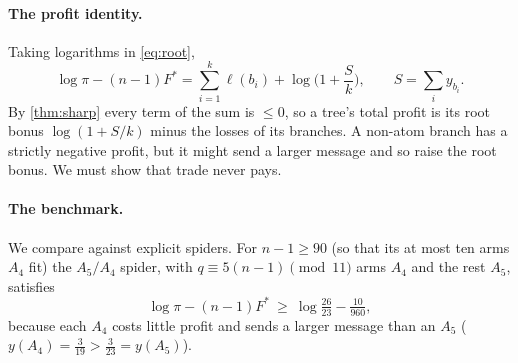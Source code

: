 \documentclass[11pt]{article}
\theoremstyle{definition}
\newcommand{\bell}{\ell}
\newcommand{\Fs}{F^{\ast}}
\begin{document}
\paragraph{The profit identity.} Taking logarithms in \eqref{eq:root},
\begin{equation}\label{eq:lagrange}
  \log\pi-(n-1)\Fs=\sum_{i=1}^{k}\bell(b_i)+\log\Big(1+\frac{S}{k}\Big),\qquad S=\sum_i y_{b_i}.
\end{equation}
By \cref{thm:sharp} every term of the sum is $\le0$, so a tree's total profit is its root bonus
$\log(1+S/k)$ minus the losses of its branches. A non-atom branch has a strictly negative profit, but it
might send a larger message and so raise the root bonus. We must show that trade never pays.

\paragraph{The benchmark.} We compare against explicit spiders. For $n-1\ge90$ (so that its at most ten arms
$A_4$ fit) the $A_5/A_4$ spider, with $q\equiv5(n-1)\pmod{11}$ arms $A_4$ and the rest $A_5$, satisfies
\begin{equation}\label{eq:floor}
  \log\pi-(n-1)\Fs\ \ge\ \log\tfrac{26}{23}-\tfrac{10}{960},
\end{equation}
because each $A_4$ costs little profit and sends a larger message than an $A_5$
($y(A_4)=\tfrac3{19}>\tfrac3{23}=y(A_5)$).
\end{document}
